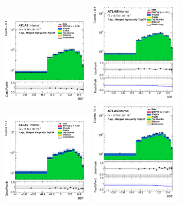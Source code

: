 \begin{figure}[!ht]
	\centering
	\includegraphics[width=0.42\textwidth]{Chapter5/BDT_1lep_HP_CRTop_prefit.pdf}	\includegraphics[width=0.42\textwidth]{Chapter5/BDT_1lep_HP_CRTop_postfit.pdf}
	\includegraphics[width=0.42\textwidth]{Chapter5/BDT_1lep_LP_CRTop_prefit.pdf}
	\includegraphics[width=0.42\textwidth]{Chapter5/BDT_1lep_LP_CRTop_postfit.pdf}

\end{figure}

